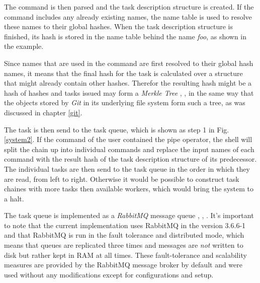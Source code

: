 The command is then parsed and the task description structure
is created. If the command includes any already existing names,
the name table is used to resolve these names to their global
hashes. When the task description structure is finished, its
hash is stored in the name table behind the name \textit{foo},
as shown in the example.

Since names that are used in the command are first resolved to
their global hash names, it means that the final hash for the
task is calculated over a structure that might already contain
other hashes. Therefor the resulting hash might be a hash of hashes
and tasks issued may form a \textit{Merkle Tree} \cite{merkletree},
\cite{merkletreewiki}, in the same way that the objects stored
by \textit{Git} in its underlying file system form such a tree,
as was discussed in chapter \ref{git}.
\newline

The task is then send to the task queue, which is shown as step
1 in Fig.\ref{system2}. If the command of the user contained the
pipe operator, the shell will split the chain up into individual
commands and replace the input names of each command with the
result hash of the task description structure of its
predecessor. The individual tasks are then send to the task
queue in the order in which they are read, from left to right.
Otherwise it would be possible to construct task chaines with
more tasks then available workers, which would bring the system
to a halt.

The task queue is implemented
as a \textit{RabbitMQ} message queue \cite{rabbitmq},
\cite{rabbitmqwiki}, \cite{rabbitmqbook}. It's important to
note that the current implementation uses RabbitMQ in the
version 3.6.6-1 and that RabbitMQ is run in the fault tolerance
and distributed mode, which means that queues are replicated three
times and messages are \textit{not} written to disk but rather kept in
RAM at all times. These fault-tolerance and scalability measures
are provided by the RabbitMQ message broker by default and were
used without any modifications except for configurations and
setup.
\newline

